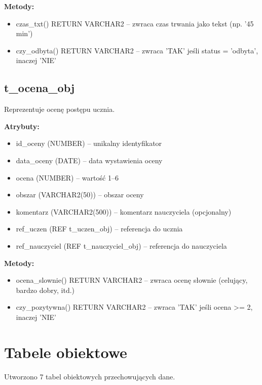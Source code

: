 \documentclass[12pt,a4paper]{article}
\begin{document}
\textbf{Metody:}
\begin{itemize}[nosep]
    \item czas\_txt() RETURN VARCHAR2 -- zwraca czas trwania jako tekst (np. '45 min')
    \item czy\_odbyta() RETURN VARCHAR2 -- zwraca 'TAK' jeśli status = 'odbyta', inaczej 'NIE'
\end{itemize}

\subsection{t\_ocena\_obj}

Reprezentuje ocenę postępu ucznia.

\textbf{Atrybuty:}
\begin{itemize}[nosep]
    \item id\_oceny (NUMBER) -- unikalny identyfikator
    \item data\_oceny (DATE) -- data wystawienia oceny
    \item ocena (NUMBER) -- wartość 1--6
    \item obszar (VARCHAR2(50)) -- obszar oceny
    \item komentarz (VARCHAR2(500)) -- komentarz nauczyciela (opcjonalny)
    \item ref\_uczen (REF t\_uczen\_obj) -- referencja do ucznia
    \item ref\_nauczyciel (REF t\_nauczyciel\_obj) -- referencja do nauczyciela
\end{itemize}

\textbf{Metody:}
\begin{itemize}[nosep]
    \item ocena\_slownie() RETURN VARCHAR2 -- zwraca ocenę słownie (celujący, bardzo dobry, itd.)
    \item czy\_pozytywna() RETURN VARCHAR2 -- zwraca 'TAK' jeśli ocena >= 2, inaczej 'NIE'
\end{itemize}

\newpage
\section{Tabele obiektowe}

Utworzono 7 tabel obiektowych przechowujących dane.
\end{document}
